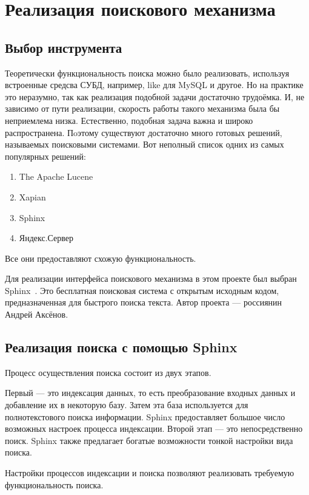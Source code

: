 \section{Реализация поискового механизма}


\subsection{Выбор инструмента}

Теоретически функциональность поиска можно было реализовать, используя
встроенные средсва СУБД, например, like для MySQL и другое.
Но на практике это неразумно, так как реализация подобной задачи 
достаточно трудоёмка.
И, не зависимо от пути реализации, скорость работы такого механизма была бы неприемлема низка.
Естественно, подобная задача важна и широко распространена.
Пoэтому существуют достаточно много готовых решений, называемых поисковыми системами.
Вот неполный список одних из самых популярных решений:
\begin{enumerate}
    \item The Apache Lucene 
    \item Xapian
    \item Sphinx
    \item Яндекс.Сервер
\end{enumerate}

Все они предоставляют схожую функциональность.

Для реализации интерфейса поискового механизма в этом проекте был выбран Sphinx~\cite{sphinx}. 
Это бесплатная поисковая система с открытым исходным кодом, 
предназначенная для быстрого поиска текста. 
Автор проекта --- россиянин Андрей Аксёнов.

\subsection{Реализация поиска с помощью Sphinx}

Процесс осуществления поиска состоит из двух этапов.

Первый --- это индексация данных, то есть преобразование входных данных и добавление их в некоторую базу.
Затем эта база используется для полнотекстового поиска информации.
Sphinx предоставляет большое число возможных настроек процесса индексации.
Второй этап --- это непосредственно поиск. Sphinx также предлагает богатые возможности тонкой настройки вида поиска.

Настройки процессов индексации и поиска позволяют реализовать требуемую функциональность поиска.

